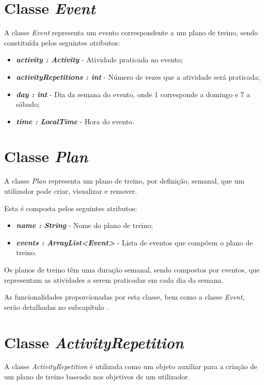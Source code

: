 \documentclass[a4paper,12pt]{scrreprt}
\begin{document}
\section{Classe \textit{Event}}
    A classe \textit{Event} representa um evento correspondente a um plano de treino, sendo constituída pelos seguintes atributos:

    \begin{itemize}
        \item \textit{\textbf{activity : Activity}} - Atividade praticada no evento;
        \item \textit{\textbf{activityRepetitions : int}} - Número de vezes que a atividade será praticada;
        \item \textit{\textbf{day : int}} - Dia da semana do evento, onde 1 corresponde a domingo e 7 a sábado;
        \item \textit{\textbf{time : LocalTime}} - Hora do evento.
    \end{itemize}

\section{Classe \textit{Plan}}
    A classe \textit{Plan} representa um plano de treino, por definição, semanal, que um utilizador pode criar, visualizar e remover.

    Esta é composta pelos seguintes atributos:
    \begin{itemize}
        \item \textit{\textbf{name : String}} - Nome do plano de treino;
        \item \textit{\textbf{events : ArrayList<Event>}} - Lista de eventos que compõem o plano de treino.
    \end{itemize}

    Os planos de treino têm uma duração semanal, sendo compostos por eventos, que representam as atividades a serem praticadas em cada dia da semana.

    As funcionalidades proporcionadas por esta classe, bem como a classe \textit{Event}, serão detalhadas no subcapítulo \textit{}.

\section{Classe \textit{ActivityRepetition}}
    A classe \textit{ActivityRepetition} é utilizada como um objeto auxiliar para a criação de um plano de treino baseado nos objetivos de um utilizador.
\end{document}
